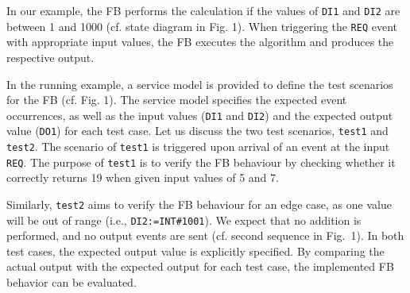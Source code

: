 \documentclass[conference]{IEEEtran}
\begin{document}
In our example, the FB performs the calculation if the values of \texttt{DI1} and \texttt{DI2} are between 1 and 1000 (cf. state diagram in Fig. 1). When triggering the \texttt{REQ} event with appropriate input values, the FB executes the algorithm and produces the respective output. 

In the running example, a service model is provided to define the test scenarios for the FB (cf. Fig. 1). The service model specifies the expected event occurrences, as well as the input values (\texttt{DI1} and \texttt{DI2}) and the expected output value (\texttt{DO1}) for each test case. 
Let us discuss the two test scenarios,  \texttt{test1} and \texttt{test2}. 
The scenario of \texttt{test1} is triggered upon arrival of an event at the input \texttt{REQ}. The purpose of \texttt{test1} is to verify the FB behaviour by checking whether it correctly returns 19 when given input values of 5 and 7. 

Similarly, \texttt{test2} aims to verify the FB behaviour for an edge case, as one value will be out of range (i.e., \texttt{DI2:=INT\#1001}). We expect that no addition is performed, and no output events are sent (cf. second sequence in Fig.~1). 
In both test cases, the expected output value is explicitly specified. By comparing the actual output with the expected output for each test case, the implemented FB behavior can be evaluated.%
\end{document}
